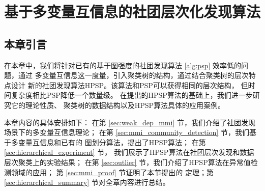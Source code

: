 
\chapter{基于多变量互信息的社团层次化发现算法}\label{chap:info_clustering}
\section{本章引言}
在本章中，我们将针对已有的基于图强度的社团发现算法 \ref{alg:psp} 效率低的问题，通过
多变量互信息这一度量，引入聚类树的结构，通过结合聚类树的层次特点设计
新的社团发现算法HPSP。该算法和PSP可以获得相同的层次结构，
但时间复杂度相比PSP降低一个数量级。
在提出的HPSP算法的基础上，我们进一步研究它的理论性质、
聚类树的数据结构以及HPSP算法具体的应用案例。

本章内容的具体安排如下：
在第 \ref{sec:weak_dep_mmi} 节，我们介绍了社团发现场景下的多变量互信息理论；
在第 \ref{sec:mmi_community_detection} 节，我们基于多变量互信息和已有的
图划分算法，提出了HPSP算法；
在第 \ref{sec:hierarchical_experiment} 节，
我们展示了HPSP算法在社团层次发现和数据层次聚类上的实验结果；
在第 \ref{sec:outlier} 节，我们介绍了HPSP算法在异常值检测领域的应用；
第 \ref{sec:mmi_proof} 节证明了本节提出的
定理；第 \ref{sec:hierarchical_summary} 节对全章内容进行总结。

